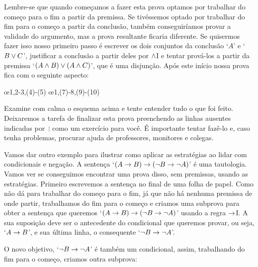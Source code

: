 Lembre-se que quando começamos a fazer esta prova optamos por trabalhar do começo para o fim a partir da premissa. Se tivéssemos optado por trabalhar do fim para o começo a partir da conclusão, também conseguiríamos provar a validade do argumento, mas a prova resultante ficaria diferente. Se quisermos fazer isso nosso primeiro passo é escrever os dois conjuntos da conclusão  `$A$' e `$B \vee C$', justificar a conclusão a partir deles por $\wedge$I e tentar prová-los a partir da premissa `$(A\wedge B) \vee (A\wedge C)$', que é uma disjunção. Após este início nossa prova fica com o seguinte aspecto:

\begin{fitchproof}
	\open
	\ellipsesline
	\close
	\open
	\ellipsesline
	\close
	\oe{1,2-3,(4)-(5)}
	\open
	\ellipsesline
	\close
	\open
	\ellipsesline
	\close
	\oe{1,(7)-8,(9)-(10)}	
\end{fitchproof}
Examine com calma o esquema acima e tente entender tudo o que foi feito. Deixaremos a tarefa de finalizar esta prova preenchendo as linhas ausentes indicadas por~$\vdots$ como um exercício para você. É importante tentar fazê-lo e, caso tenha problemas, procurar ajuda de professores, monitores e colegas.

Vamos dar outro exemplo para ilustrar como aplicar as estratégias ao lidar com condicionais e negação. A sentença `$(A \rightarrow B) \rightarrow (\neg B \rightarrow \neg A)$' é uma tautologia.  Vamos ver se conseguimos encontrar uma prova disso, sem premissas, usando as estratégias. Primeiro escrevemos a sentença no final de uma folha de papel. 
Como não dá para trabalhar do começo para o fim, já que não há nenhuma premissa de onde partir, trabalhamos do fim para o começo e criamos uma subprova para obter a  sentença que queremos `$(A \rightarrow B) \rightarrow (\neg B \rightarrow \neg A)$' usando a regra  $\rightarrow$I. A sua suposição deve ser o antecedente do condicional que queremos provar, ou seja, `$A \rightarrow B$', e sua última linha, o consequente `$\neg B \rightarrow \neg A$'.
 

\begin{fitchproof}
\open
{}
\ellipsesline
{}
\close
{}
\end{fitchproof}
O novo objetivo, `$\neg B \rightarrow \neg A$' é  também  um  condicional, assim, trabalhando do fim para o começo, criamos outra subprova:

